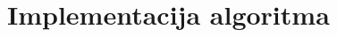 \newpage
\setcounter{figure}{0}

\section{Implementacija algoritma} %
\label{sec:Implementacija algoritma}

